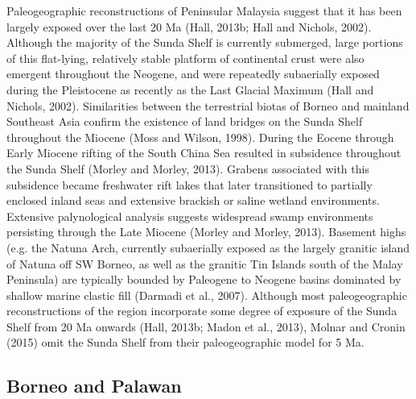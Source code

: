 \documentclass[11pt,letterpaper]{article}
\begin{document}
Paleogeographic reconstructions of Peninsular Malaysia suggest that it has been largely exposed over the last 20 Ma (Hall, 2013b; Hall and Nichols, 2002). Although the majority of the Sunda Shelf is currently submerged, large portions of this flat-lying, relatively stable platform of continental crust were also emergent throughout the Neogene, and were repeatedly subaerially exposed during the Pleistocene as recently as the Last Glacial Maximum (Hall and Nichols, 2002). Similarities between the terrestrial biotas of Borneo and mainland Southeast Asia confirm the existence of land bridges on the Sunda Shelf throughout the Miocene (Moss and Wilson, 1998). During the Eocene through Early Miocene rifting of the South China Sea resulted in subsidence throughout the Sunda Shelf (Morley and Morley, 2013). Grabens associated with this subsidence became freshwater rift lakes that later transitioned to partially enclosed inland seas and extensive brackish or saline wetland environments. Extensive palynological analysis suggests widespread swamp environments persisting through the Late Miocene (Morley and Morley, 2013). Basement highs (e.g. the Natuna Arch, currently subaerially exposed as the largely granitic island of Natuna off SW Borneo, as well as the granitic Tin Islands south of the Malay Peninsula) are typically bounded by Paleogene to Neogene basins dominated by shallow marine clastic fill (Darmadi et al., 2007). Although most paleogeographic reconstructions of the region incorporate some degree of exposure of the Sunda Shelf from 20 Ma onwards (Hall, 2013b; Madon et al., 2013), Molnar and Cronin (2015) omit the Sunda Shelf from their paleogeographic model for 5 Ma.

\subsection*{Borneo and Palawan}
\end{document}
